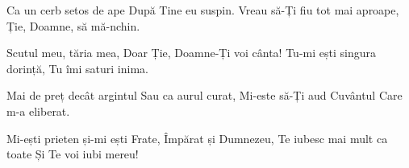 \beginverse
Ca un cerb setos de ape
După Tine eu suspin.
Vreau să-Ți fiu tot mai aproape,
Ție, Doamne, să mă-nchin.
\endverse

\beginchorus
Scutul meu, tăria mea,
Doar Ție, Doamne-Ți voi cânta!
Tu-mi ești singura dorință,
Tu îmi saturi inima.
\endchorus

\beginverse
Mai de preț decât argintul
Sau ca aurul curat,
Mi-este să-Ți aud Cuvântul
Care m-a eliberat.
\endverse

\beginverse
Mi-ești prieten și-mi ești Frate,
Împărat și Dumnezeu,
Te iubesc mai mult ca toate
Și Te voi iubi mereu!
\endverse
\endsong